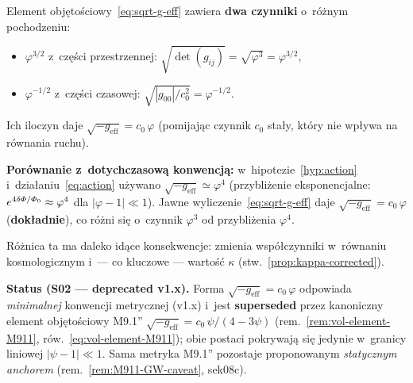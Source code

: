 \begin{remark}%
\label{rem:volume-element}
Element obj\k{e}to\'sciowy~\eqref{eq:sqrt-g-eff} zawiera
\textbf{dwa czynniki} o~r\'o\.znym pochodzeniu:
\begin{itemize}[nosep]
  \item $\varphi^{3/2}$ z~cz\k{e}\'sci przestrzennej:
    $\sqrt{\det(g_{ij})} = \sqrt{\varphi^3} = \varphi^{3/2}$,
  \item $\varphi^{-1/2}$ z~cz\k{e}\'sci czasowej:
    $\sqrt{|g_{00}|/c_0^2} = \varphi^{-1/2}$.
\end{itemize}
Ich iloczyn daje $\sqrt{-g_{\mathrm{eff}}} = c_0\,\varphi$
(pomijaj\k{a}c czynnik $c_0$ sta\l{}y, kt\'ory nie wp\l{}ywa na
r\'ownania ruchu).

\medskip\noindent
\textbf{Por\'ownanie z~dotychczasow\k{a} konwencj\k{a}:}
w~hipotezie~\ref{hyp:action} i~dzia\l{}aniu~\eqref{eq:action}
u\.zywano
$\sqrt{-g_{\mathrm{eff}}} \simeq \varphi^4$
(przybli\.zenie eksponencjalne: $e^{4\delta\varPhi/\varPhi_0}
\approx \varphi^4$ dla $|\varphi - 1| \ll 1$).
Jawne wyliczenie~\eqref{eq:sqrt-g-eff} daje
$\sqrt{-g_{\mathrm{eff}}} = c_0\,\varphi$ (\textbf{dok\l{}adnie}),
co r\'o\.zni si\k{e} o~czynnik $\varphi^3$ od przybli\.zenia $\varphi^4$.

R\'o\.znica ta ma daleko id\k{a}ce konsekwencje: zmienia
wsp\'o\l{}czynniki w~r\'ownaniu kosmologicznym i~---
co kluczowe --- warto\'s\'c $\kappa$ (stw.~\ref{prop:kappa-corrected}).

\medskip\noindent
\textbf{Status (S02 --- deprecated v1.x).} Forma
$\sqrt{-g_{\mathrm{eff}}} = c_0\,\varphi$ odpowiada \emph{minimalnej}
konwencji metrycznej (v1.x) i~jest \textbf{superseded} przez kanoniczny
element obj\k{e}to\'sciowy M9.1''
$\sqrt{-g_{\mathrm{eff}}} = c_0\,\psi/(4-3\psi)$
(rem.~\ref{rem:vol-element-M911}, r\'ow.~\eqref{eq:vol-element-M911});
obie postaci pokrywaj\k{a} si\k{e} jedynie w~granicy liniowej
$|\psi-1|\ll1$. Sama metryka M9.1'' pozostaje proponowanym
\emph{statycznym anchorem} (rem.~\ref{rem:M911-GW-caveat}, sek08c).
\end{remark}

